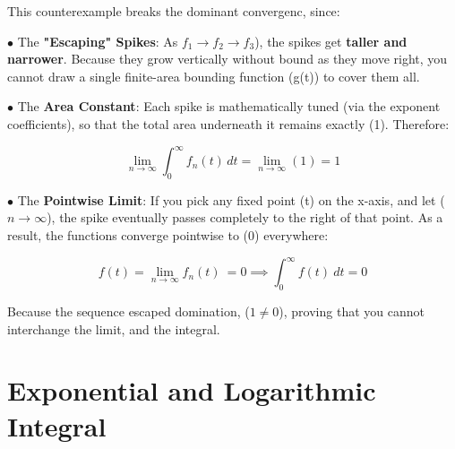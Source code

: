 \documentclass[a4paper, 10pt, onepage]{elegantbook}
\begin{document}
{

This counterexample breaks the dominant convergenc, since:  

$\bullet$ The \textbf{"Escaping" Spikes}: As $f_1 \rightarrow f_2 \rightarrow f_3$), the spikes get \textbf{taller and 
narrower}. Because they grow vertically without bound as they move right, you cannot draw a single finite-area bounding 
function (g(t)) to cover them all.  

$\bullet$ The \textbf{Area Constant}: Each spike is mathematically tuned (via the exponent coefficients), so that the 
total area underneath it remains exactly (1). Therefore:

\[
\lim_{n \to \infty} \int_{0}^{\infty} f_n(t) \, dt = \lim_{n \to \infty} (1) = 1
\]

$\bullet$ The \textbf{Pointwise Limit}: If you pick any fixed point (t) on the x-axis, and let ($n \to \infty$), the 
spike eventually passes completely to the right of that point. As a result, the functions converge pointwise to (0) 
everywhere:  

\[
f(t) = \lim_{n \to \infty} f_n (t) \ = 0 \implies \int_0^\infty f(t) \ dt = 0
\]

Because the sequence escaped domination, ($1 \neq 0$), proving that you cannot interchange the limit, and the integral.



\section{Exponential and Logarithmic Integral}

}
\end{document}

